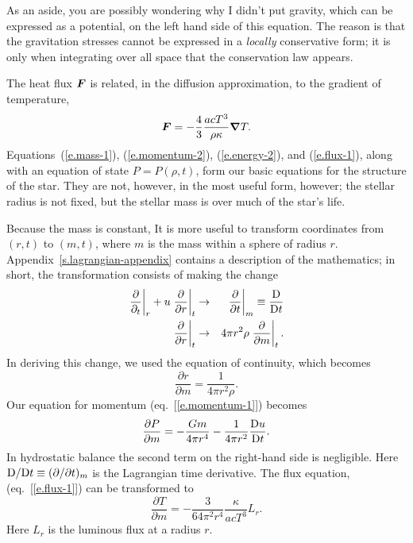 As an aside, you are possibly wondering why I didn't put gravity, which can be expressed as a potential, on the left hand side of this equation.  The reason is that the gravitation stresses cannot be expressed in a  \emph{locally} conservative form; it is only when integrating over all space that the conservation law appears.

The heat flux $\boldsymbol{F}$ is related, in the diffusion approximation, to the gradient of temperature,
\begin{equation}\label{e.flux-1}
\boldsymbol{F} = -\frac{4}{3}\frac{acT^{3}}{\rho\kappa}\boldsymbol{\nabla} T.
\end{equation}
Equations~(\ref{e.mass-1}), (\ref{e.momentum-2}), (\ref{e.energy-2}), and (\ref{e.flux-1}), along with an equation of state $P = P(\rho,t)$, form our basic equations for the structure of the star.  They are not, however, in the most useful form, however; the stellar radius is not fixed, but the stellar mass is over much of the star's life.  

Because the mass is constant, It is more useful to transform coordinates from $(r,t)$ to $(m,t)$, where $m$ is the mass within a sphere of radius $r$.  Appendix~\ref{s.lagrangian-appendix} contains a description of the mathematics; in short, the transformation consists of making the change
\begin{eqnarray}
	\label{e.lagrange-rule-1}
	\left.\frac{\partial}{\partial_{t}}\right|_{r} + u\left.\frac{\partial}{\partial r}\right|_{t} 
	&\to& \left.\frac{\partial}{\partial t}\right|_{m} \equiv \frac{\mathrm{D}}{\mathrm{D} t} \\
	\label{e.lagrange-rule-2}
	\left.\frac{\partial}{\partial r}\right|_{t} &\to& 4\pi r^{2}\rho \left.\frac{\partial}{\partial m}\right|_{t}.
\end{eqnarray}
In deriving this change, we used the equation of continuity, which becomes
\begin{equation}\label{e.lagrange-r}
\frac{\partial r}{\partial m} = \frac{1}{4\pi r^{2}\rho}.
\end{equation}
Our equation for momentum (eq.~[\ref{e.momentum-1}]) becomes
\begin{equation}\label{e.lagrange-momentum}
\frac{\partial P}{\partial m} = -\frac{Gm}{4\pi r^{4}} - \frac{1}{4\pi r^{2}}\frac{\mathrm{D} u}{\mathrm{D} t}.
\end{equation}
In hydrostatic balance the second term on the right-hand side is negligible.  Here $\mathrm{D}/\mathrm{D} t \equiv (\partial/\partial t)_{m}$ is the Lagrangian time derivative.  The flux equation, (eq.~[\ref{e.flux-1}]) can be transformed to
\begin{equation}\label{e.lagrange-flux}
	\frac{\partial T}{\partial m} = -\frac{3}{64\pi^{2}r^{4}}\frac{\kappa}{ac T^{3}}L_{r}.
\end{equation}
Here $L_{r}$ is the luminous flux at a radius $r$. 

